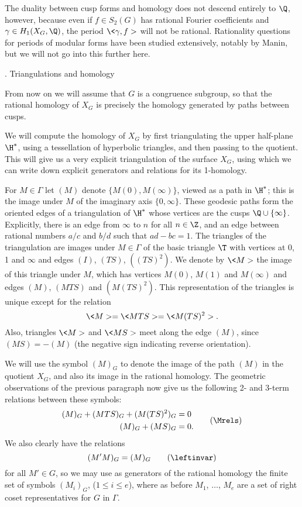 The duality between cusp forms and homology does not descend entirely
to $\Q$, however, because even if $f\in S_2(G)$ has rational Fourier
coefficients and $\gamma\in H_1(X_G,\Q)$, the period $\<\gamma,f>$
will not be rational.  Rationality questions for periods of modular
forms have been studied extensively, notably by Manin, but we will not
go into this further here.

\beginsubsection{\triangles}
\subhead \triangles. Triangulations and homology \endsubhead

From now on we will assume that $G$ is a congruence subgroup, so that
the rational homology of $X_G$ is precisely the homology generated by
paths between cusps.

We will compute the homology of $X_G$ by first triangulating the upper
half-plane $\H^*$, using a tessellation of hyperbolic triangles, and
then passing to the quotient.  This will give us a very explicit
triangulation of the surface $X_G$, using which we can write down
explicit generators and relations for its 1-homology.

For $M\in\Gamma$ let $(M)$ denote $\{M(0),M(\infty)\}$, viewed as a
path in $\H^*$; this is the image under $M$ of the imaginary axis
$\{0,\infty\}$.  These geodesic paths form the oriented edges of a
triangulation of $\H^*$ whose vertices are the cusps
$\Q\cup\{\infty\}$. Explicitly, there is an edge from $\infty$ to $n$
for all $n\in\Z$, and an edge between rational numbers $a/c$ and $b/d$
such that $ad-bc=1$.  The triangles of the triangulation are images
under $M\in\Gamma$ of the basic triangle $\T$ with vertices at 0, 1
and $\infty$ and edges $(I)$, $(TS)$, $((TS)^2)$.  We denote by $\<M>$
the image of this triangle under $M$, which has vertices $M(0)$,
$M(1)$ and $M(\infty)$ and edges $(M)$, $(MTS)$ and $(M(TS)^2)$.  This
representation of the triangles is unique except for the relation
$$
   \<M> = \<MTS> = \<M(TS)^2>.
$$
Also, triangles $\<M>$ and $\<MS>$ meet along the edge
$(M)$, since $(MS)=-(M)$ (the negative sign indicating
reverse orientation).

We will use the symbol $(M)_G$ to denote the image of the path $(M)$
in the quotient $X_G$, and also its image in the rational homology.
The geometric observations of the previous paragraph now give us the
following 2- and 3-term relations between these symbols:\neweq\Mrels
$$
  \aligned
   (M)_G + (MTS)_G + (M(TS)^2)_G &= 0 \\
   (M)_G + (MS)_G  &= 0. \\
  \endaligned\tag\Mrels
$$
We also clearly have the relations 
\neweq{\leftinvar}
$$
   (M'M)_G=(M)_G   \tag\leftinvar
$$ 
for all $M'\in G$, so we may use as generators of the rational homology
the finite set of symbols $(M_i)_G$, ($1\le i\le e$), where as before
$M_1$, $\ldots$, $M_e$ are a set of right coset
representatives for $G$ in $\Gamma$.

